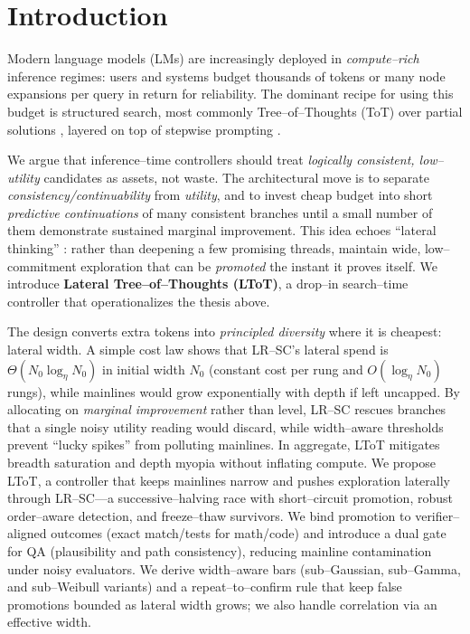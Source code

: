 \documentclass{article}
\begin{document}
\section{Introduction}\label{section:introduction}

Modern language models (LMs) are increasingly deployed in \emph{compute--rich} inference regimes: users and systems budget thousands of tokens or many node expansions per query in return for reliability.
The dominant recipe for using this budget is structured search, most commonly Tree--of--Thoughts (ToT) over partial solutions \citep{yao2023tot}, layered on top of stepwise prompting \citep{wei2022cot,wang2022selfconsistency,kojima2022zeroshotcot}.

We argue that inference--time controllers should treat \emph{logically consistent, low--utility} candidates as assets, not waste.
The architectural move is to separate \emph{consistency/continuability} from \emph{utility}, and to invest cheap budget into short \emph{predictive continuations} of many consistent branches until a small number of them demonstrate sustained marginal improvement.
This idea echoes ``lateral thinking'' \citep{debono1967lateral}: rather than deepening a few promising threads, maintain wide, low--commitment exploration that can be \emph{promoted} the instant it proves itself. We introduce \textbf{Lateral Tree--of--Thoughts (LToT)}, a drop--in search--time controller that operationalizes the thesis above.

The design converts extra tokens into \emph{principled diversity} where it is cheapest: lateral width.
A simple cost law shows that LR--SC's lateral spend is $\Theta(N_0\log_{\eta} N_0)$ in initial width $N_0$ (constant cost per rung and $O(\log_{\eta} N_0)$ rungs), while mainlines would grow exponentially with depth if left uncapped.
By allocating on \emph{marginal improvement} rather than level, LR--SC rescues branches that a single noisy utility reading would discard, while width--aware thresholds prevent ``lucky spikes'' from polluting mainlines.
In aggregate, LToT mitigates breadth saturation and depth myopia without inflating compute. We propose LToT, a controller that keeps mainlines narrow and pushes exploration laterally through LR--SC---a successive--halving race with short--circuit promotion, robust order--aware detection, and freeze--thaw survivors. We bind promotion to verifier--aligned outcomes (exact match/tests for math/code) and introduce a dual gate for QA (plausibility and path consistency), reducing mainline contamination under noisy evaluators. We derive width--aware bars (sub--Gaussian, sub--Gamma, and sub--Weibull variants) and a repeat--to--confirm rule that keep false promotions bounded as lateral width grows; we also handle correlation via an effective width.
\end{document}
